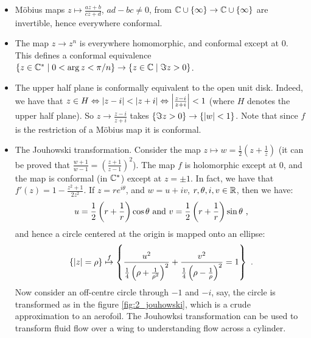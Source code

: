 \begin{itemize}
\item Möbius maps $z \mapsto \frac{az+b}{cz+d}$, $ad - bc \neq 0$, from $\CC \cup \{ \infty \} \rightarrow \CC \cup \{ \infty \}$ are invertible, hence everywhere conformal.
\item The map $z \rightarrow z^n$ is everywhere homomorphic, and conformal except at $0$. This defines a conformal equivalence $\{ z \in \CC^* \mid 0 < \arg z < \pi/n \} \rightarrow \{ z \in \CC \mid \Im z > 0 \}$.
\item The upper half plane is conformally equivalent to the open unit disk. Indeed, we have that $z \in H \Leftrightarrow \abs{z - i} < \abs{z + i} \Leftrightarrow \abs*{\frac{z-i}{z+i}} < 1$ (where $H$ denotes the upper half plane). So $z \rightarrow \frac{z-i}{z+i}$ takes $\{ \Im z > 0 \} \rightarrow \{ \abs{w} < 1 \}$. Note that since $f$ is the restriction of a Möbius map it is conformal.
\item The Jouhowski transformation. Consider the map $z \mapsto w = \frac{1}{2}\left(z + \frac{1}{z}\right)$ (it can be proved that $\frac{w + 1}{w - 1} = \left(\frac{z + 1}{z - 1}\right)^2$).
The map $f$ is holomorphic except at $0$, and the map is conformal (in $\CC^*$) except at $z = \pm 1$.
In fact, we have that $f'(z) = 1 - \frac{z^2 + 1}{2z^2}$. If $z = re^{i\theta}$, and $w = u + iv$, $r, \theta, i, v \in \RR$, then we have:
\[
u = \frac{1}{2}\left(r + \frac{1}{r}\right)\cos \theta \text{ and } v = \frac{1}{2}\left(r + \frac{1}{r}\right)\sin \theta \mpunct{,}
\]
and hence a circle centered at the origin is mapped onto an ellipse:
\[
\{ \abs{z} = \rho \} \stackrel{f}{\mapsto} \left\{ \frac{u^2}{\frac{1}{4}\left(\rho + \frac{1}{\rho^2}\right)^2} + \frac{v^2}{\frac{1}{4}\left(\rho - \frac{1}{\rho}\right)^2} = 1 \right\} \mpunct{.}
\]
Now consider an off-centre circle through $-1$ and $-i$, say, the circle is transformed as in the figure \ref{fig:2_jouhowski}, which is a crude approximation to an aerofoil. The Jouhowksi transformation can be used to transform fluid flow over a wing to understanding flow across a cylinder.
\end{itemize}

